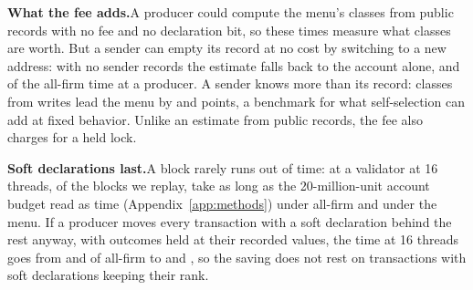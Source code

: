 \documentclass[conference,compsoc]{IEEEtran}
\numberwithin{equation}{section}
\theoremstyle{plain}
\theoremstyle{definition}
\theoremstyle{remark}
\newcommand{\runin}[1]{\par\smallskip\noindent\textbf{#1.}\enspace}
\begin{document}
\runin{What the fee adds}A producer could compute the menu's classes from public records with no fee and no declaration bit, so these times measure what classes are worth. But a sender can empty its record at no cost by switching to a new address: with no sender records the estimate falls back to the account alone, \freeAcctLoRatioSixteenA{} and \freeAcctLoRatioSixteenB{} of the all-firm time at a producer. A sender knows more than its record: classes from writes lead the menu by \freeLeadPerfectSixteenA{} and \freeLeadPerfectSixteenB{} points, a benchmark for what self-selection can add at fixed behavior. Unlike an estimate from public records, the fee also charges for a held lock.

\runin{Soft declarations last}A block rarely runs out of time: at a validator at 16 threads, of the \slAllBlocks{} blocks we replay, \slFirmOverBudget{} take as long as the 20-million-unit account budget read as time (Appendix~\ref{app:methods}) under all-firm and \slClassOverBudget{} under the menu. If a producer moves every transaction with a soft declaration behind the rest anyway, with outcomes held at their recorded values, the time at 16 threads goes from \slFreeRankA{} and \slFreeRankB{} of all-firm to \slFreeLastA{} and \slFreeLastB{}, so the saving does not rest on transactions with soft declarations keeping their rank.
\end{document}
